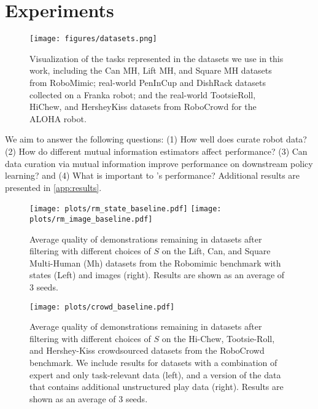 \section{Experiments}
\begin{figure}
    \centering
    \texttt{[image: figures/datasets.png]}
    \vspace{-0.2in}
    \caption{Visualization of the tasks represented in the datasets we use in this work, including the Can MH, Lift MH, and Square MH datasets from RoboMimic; real-world PenInCup and DishRack datasets collected on a Franka robot; and the real-world TootsieRoll, HiChew, and HersheyKiss datasets from RoboCrowd for the ALOHA robot.}
    \label{fig:datasets}
\end{figure}

We aim to answer the following questions: (1) How well does \abv curate robot data? (2) How do different mutual information estimators affect performance? (3) Can data curation via mutual information improve performance on downstream policy learning? and (4) What is important to \abv's performance? Additional results are presented in \cref{app:results}.

\begin{figure*}[t]
    \centering
    \texttt{[image: plots/rm\_state\_baseline.pdf]}
    \texttt{[image: plots/rm\_image\_baseline.pdf]}
    \vspace{-0.15in}
    \caption{Average quality of demonstrations remaining in datasets after filtering with different choices of $S$ on the Lift, Can, and Square Multi-Human (Mh) datasets from the Robomimic benchmark with states (Left) and images (right). Results are shown as an average of 3 seeds.}
    \label{fig:robomimic_baseline}
\end{figure*}


\begin{figure*}[t]
    \centering
    \texttt{[image: plots/crowd\_baseline.pdf]}
    \caption{Average quality of demonstrations remaining in datasets after filtering with different choices of $S$ on the Hi-Chew, Tootsie-Roll, and Hershey-Kiss crowdsourced datasets from the RoboCrowd benchmark. We include results for datasets with a combination of expert and only task-relevant data (left), and a version of the data that contains additional unstructured play data (right).  Results are shown as an average of 3 seeds.}
    \label{fig:robocrowd_image}
\end{figure*}



